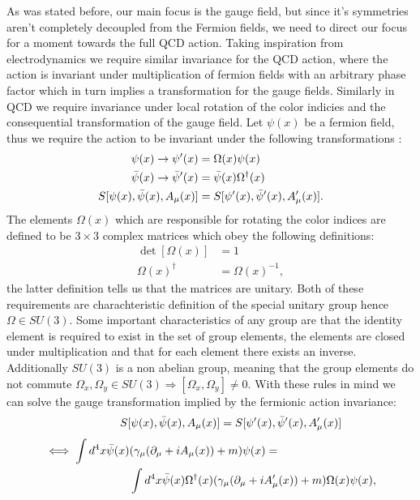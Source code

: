 \documentclass[english,twoside,openright]{UH_TCM_MSc}
\begin{document}
As was stated before, our main focus is the gauge field, but since it's symmetries aren't completely decoupled from the Fermion fields, we need to direct our focus for a moment towards the full QCD action. Taking inspiration from electrodynamics we require similar invariance for the QCD action, where the action is invariant under multiplication of fermion fields with an arbitrary phase factor which in turn implies a transformation for the gauge fields. Similarly in QCD we require invariance under local rotation of the color indicies and the consequential transformation of the gauge field. Let $\psi(x)$ be a fermion field, thus we require the action to be invariant under the following transformations \cite[p.~28]{gattringer2009quantum}:
\begin{align}
    \psi(x) \rightarrow \psi'(x) &= \Omega(x)\psi(x) \\
    \Bar{\psi}(x) \rightarrow \Bar{\psi}'(x) &= \Bar{\psi}(x)\Omega^\dagger(x) \\
    S[\psi(x),\Bar{\psi}(x),A_\mu(x)] &= S[\psi'(x),\Bar{\psi}'(x),A'_\mu(x)].
\end{align}
The elements $\Omega(x)$ which are responsible for rotating the color indices are defined to be $3\times 3$ complex matrices which obey the following definitions:
\begin{align}
    \det[\Omega(x)] &= 1 \\
    \Omega(x)^\dagger &= \Omega(x)^{-1}, \label{eq:2.6}
\end{align}
the latter definition tells us that the matrices are unitary. Both of these requirements are charachteristic definition of the special unitary group hence $\Omega \in SU(3)$. Some important characteristics of any group are that the identity element is required to exist in the set of group elements, the elements are closed under multiplication and that for each element there exists an inverse. Additionally $SU(3)$ is a non abelian group, meaning that the group elements do not commute $\Omega_x,\Omega_y \in SU(3) \Rightarrow [\Omega_x,\Omega_y]\neq 0$. With these rules in mind we can solve the gauge transformation implied by the fermionic action invariance:
\begin{align}
    \hspace{36px}S[\psi(x),\Bar{\psi}(x),A_\mu(x)] = S[\psi'(x),\Bar{\psi}'(x),A'_\mu(x)]
\end{align}
\begin{align}
     \iff \int d^4x \Bar{\psi}(x)&(\gamma_\mu(\partial_\mu + iA_\mu(x)) + m)\psi(x)  = \\
     &\int d^4x \Bar{\psi}(x) \Omega^\dagger(x)(\gamma_\mu(\partial_\mu + iA'_\mu(x)) + m)\Omega(x)\psi(x),
\end{align}
\end{document}
